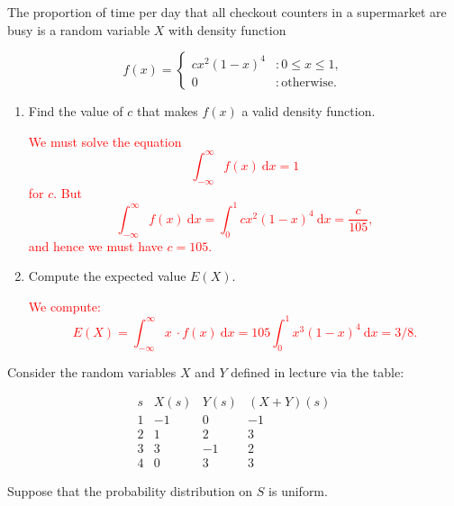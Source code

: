 \documentclass[12pt,reqno]{amsart}
\begin{document}
\bigskip
\prob The proportion of time per day that all checkout counters in a supermarket are busy is a random variable $X$ with density function

    \[f(x) = \begin{cases}
        cx^2(1-x)^4 & : 0 \leq x \leq 1, \\
        0 & : \text{otherwise}.
    \end{cases}\]

\medskip
\begin{enumerate}
    \item Find the value of $c$ that makes $f(x)$ a valid density function.
    
    \bigskip
    \textcolor{red}{We must solve the equation
        \[\int_{-\infty}^\infty f(x) \ \text{d} x  = 1\]
    for $c$. But
        \[\int_{-\infty}^\infty f(x) \ \text{d} x = \int_0^1 cx^2(1-x)^4 \ \text{d} x = \frac{c}{105},\]
    and hence we must have $c=105$.}
    \bigskip

    \item Compute the expected value $E(X)$.
    
    \bigskip
    \textcolor{red}{We compute:
        \[E(X) = \int_{-\infty}^\infty x \ \cdot f(x) \ \text{d} x = 105 \int_0^1 x^3(1-x)^4 \ \text{d} x = 3/8.\]}
\end{enumerate}















\bigskip
\prob Consider the random variables $X$ and $Y$ defined in lecture via the table:

    \[
    \begin{array}{c|ccc}
    s & X(s) & Y(s) & (X+Y)(s) \\ \hline
    1 & -1 & 0 & -1 \\
    2 & 1 & 2 & 3 \\
    3 & 3 & -1 & 2 \\
    4 & 0 & 3 & 3
    \end{array}
    \]

Suppose that the probability distribution on $S$ is uniform.
\end{document}
